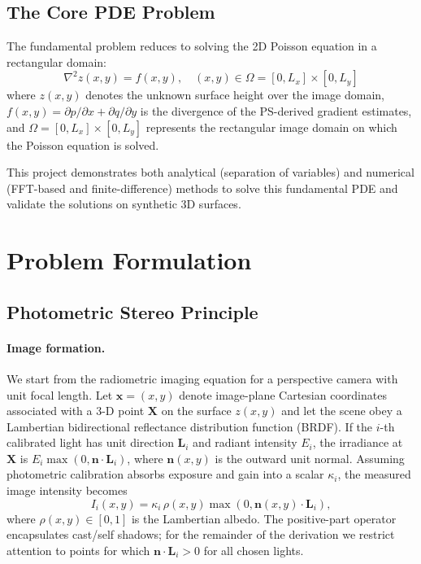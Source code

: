 \documentclass[11pt]{article}
\begin{document}
\subsection{The Core PDE Problem}

The fundamental problem reduces to solving the 2D Poisson equation in a rectangular domain:
\begin{equation}\label{eq:poisson_main}
\nabla^2 z(x,y) = f(x,y), \quad (x,y) \in \Omega = [0, L_x] \times [0, L_y]
\end{equation}
where $z(x,y)$ denotes the unknown surface height over the image
domain, $f(x,y) = \partial p/\partial x + \partial q/\partial y$
is the divergence of the PS-derived gradient estimates, and
$\Omega = [0,L_x]\times[0,L_y]$ represents the rectangular image
domain on which the Poisson equation is solved.


This project demonstrates both analytical (separation of variables) and numerical (FFT-based and finite-difference) methods to solve this fundamental PDE and validate the solutions on synthetic 3D surfaces.



\section{Problem Formulation}\label{sec:formulation}

\subsection{Photometric Stereo Principle}

\paragraph{Image formation.} We start from the radiometric imaging equation for a perspective camera with unit focal length.
Let $\mathbf{x}=(x,y)$ denote image-plane Cartesian coordinates associated with a 3-D point $\mathbf{X}$ on the surface $z(x,y)$ and let the scene obey a Lambertian bidirectional reflectance distribution function (BRDF). If the $i$-th calibrated light has unit direction $\mathbf{L}_i$ and radiant intensity $E_i$, the irradiance at $\mathbf{X}$ is $E_i \max(0, \mathbf{n}\cdot \mathbf{L}_i)$, where $\mathbf{n}(x,y)$ is the outward unit normal. Assuming photometric calibration absorbs exposure and gain into a scalar $\kappa_i$, the measured image intensity becomes
\begin{equation}
I_i(x,y) = \kappa_i\, \rho(x,y) \max(0, \mathbf{n}(x,y) \cdot \mathbf{L}_i),
\label{eq:imageformation}
\end{equation}
where $\rho(x,y) \in [0,1]$ is the Lambertian albedo. The positive-part operator encapsulates cast/self shadows; for the remainder of the derivation we restrict attention to points for which $\mathbf{n}\cdot\mathbf{L}_i>0$ for all chosen lights.
\end{document}
